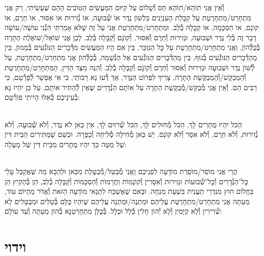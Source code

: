 \documentclass[twoside, openany, parskip=half, 11pt]{book}
\begin{document}
וְ֯אֵין אֲנִי תוׂהֵא/תוׂהָא חַס וְ֯שָׁלוׂם עַל קִיּוּם הַמַּעֲשִׂים הַטוׂבִים הָהֵם שֶׁעָשִׂיתִי, רַק אֲנִי מִתְחָרֵט/מִתְחָרֶטֶת עַל קַבָּלַת הָעִנְיָנִים בִּלְשׁוׂן נֶדֶר אוׂ שְׁ֯בוּעָה, אוׂ נְ֯זִירוּת אוׂ אִסּוּר, אוׂ חֵרֶם, אוׂ קוׂנָם, אוׂ הַסְכָּמָה, אוׂ קַבָּלָה בְּ֯לֵב. וּמִתְחָרֵט/מִתְחָרֶטֶת אֲנִי עַל זֶה שֶׁלּא אָמַרְתִּי הִנְ֯נִי עוׂשֶׂה/עוׂשָׂה דָבָר זֶה בְּ֯לִי נֶדֶר וּשְׁבוּעָה, וּנְזִירוּת וְ֯חֵרֶם וְ֯אִסּוּר, וְ֯קוׂנָם וְ֯קַבָּלָה בְּ֯לֵב. לָכֵן אֲנִי שׁוׂאֵל/שׁוׂאֶלֶת הַתָּרָה בְּ֯כֻלְּ֯הוׂן, וַאֲנִי מִתְחָרֵט/מִתְחָרֶטֶת עַל כׇּל הַנִּזְכָּר, בֵּין אִם הָיוּ הַמַּעֲשִׂים מִדְּ֯בָרִים הַנּוׂגְ֯עִים בְּ֯מָמוׂן, בֵּין מֵהַדְּ֯בָרִים הַנּוׂגְ֯עִים בְּ֯גוּף, בֵּין מֵהַדְּ֯בָרִים הַנּוׂגְ֯עִים אֶל הַנְּ֯שָׁמָה, בְּ֯כֻלְּ֯הוׂן אֲנִי מִתְחָרֵט/מִתְחָרֶטֶת, עַל לְ֯שׁוׂן נֶדֶר וּשְׁבוּעָה וּנְזִירוּת וְ֯אִסּוּר וְ֯חֵרֶם וְ֯קוׂנָם וְ֯קַבָּלָה בְ֯לֵב. וְ֯הִנֵּה מִצַּד הַדִּין, הַמִּתְחָרֵט/מִתְחָרֶטֶת וְ֯הַמְבַקֵּשׁ/וְ֯הַמְבַקֶּשֶׁת הַתָּרָה, צָרִיךְ לִפְרוׂט הַנֶּדֶר, אַךְ דְּ֯עוּ נָא רַבּוׂתַי, כִּי אִי אֶפְשָׁר לְ֯פָרְ֯טָם, כִּי רַבִּים הֵם. וְ֯אֵין אֲנִי מְ֯בַקֵּשׁ/מְ֯בַקֶּשֶׁת הַתָּרָה עַל אוׂתָם הַנְּ֯דָרִים שֶׁאֵין לְ֯הַתִּיר אוׂתָם, עַל כֵּן יִהְיוּ נָא בְ֯עֵינֵיכֶם כְּ֯אִלּוּ הָיִיתִי פוׂרְ֯טָם:

\\
הַכּל יִהְיוּ מֻתָּרִים לָךְ, הַכּל מְ֯חוּלִים לָךְ, הַכּל שְׁ֯רוּיִם לָךְ, אֵין כַּאן לֺא נֶדֶר, וְ֯לֺא שְׁ֯בוּעָה, וְ֯לֺא נְ֯זִירוּת, וְ֯לֺא חֵרֶם, וְ֯לֺא אִסָּר וְ֯לֺא קוׂנָם. יֵשׁ כַּאן מְ֯חִילָה סְ֯לִיחָה וְ֯כַפָּרָה. וּכְשֵׁם שֶׁמַּתִּירִים הַבֵּית דִּין שֶׁל מַטָּה כַּךְ יִהְיוּ מֻתָּרִים מִבֵּית דִּין שֶׁל מַעְלָה:

\\
הֲרֵי אֲנִי מוֺסֵר/מוֺסֶרֶת מוׂדָעָה לִפְנֵיכֶם וַאֲנִי מְ֯בַטֵּל/מְ֯בַטֶּלֶת מִכַּאן וּלְהַבָּא מַה שֶּׁאֲקַבֵּל עָלַי כׇּל־הַנְּ֯דָרִים וְ֯כׇל־שְׁ֯בוּעוׂת וּנְזִירוּת וְ֯אִסָּרִין וְ֯קוׂנָמוׂת וַחֲרָמוׂת וְ֯הַסְכָּמוׂת וְ֯קַבָּלָה בְ֯לֵב, הֵן בְּ֯הָקִיץ הֵן בַּחֲלוׂם חוּץ מִנִּדְרֵי תַעֲנִית בִּשְׁעַת מִנְחָה. וּבְאִם שֶׁאֶשְׁכַּח לִתְנַאי מוׂדָעָה הַזּאת וְ֯אֶדּׂר מֵהַיּוׂם עוׂד, מֵעַתָּה אֲנִי מִתְחָרֵט/מִתְחָרֶטֶת עֲלֵיהֶם וּמַתְנֶה/וּמַתְנָה עֲלֵיהֶם שֶׁיִּהְיוּ כֻּלָּם בְּ֯טֵלִים וּמְבֻטָּלִים לָא שְׁ֯רִירִין וְ֯לָא קַיָּמִין וְ֯לָא יְ֯הוׂן חָלִין כְּ֯לָל וּכְלָל. בְּ֯כֻלָּן מִתְחָרַטְנָא בְ֯הוׂן מֵעַתָּה וְ֯עַד עוׂלָם:

\vfill
\sepline




\chapter[וידוי]{ וידוי }
\end{document}
